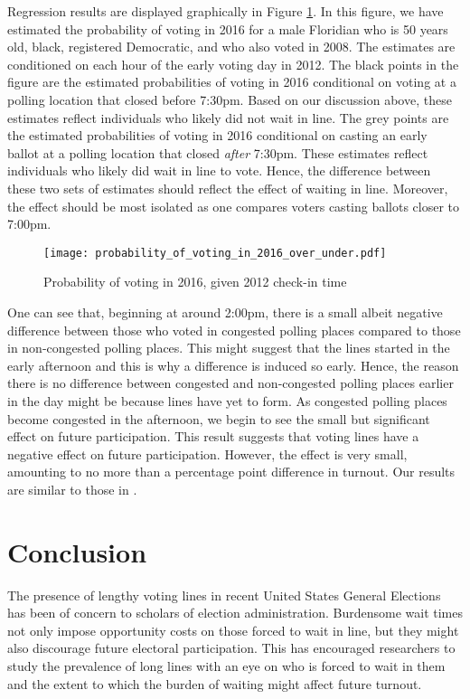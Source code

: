 \documentclass[12pt,titlepage]{article}
\begin{document}
Regression results are displayed graphically in Figure
\ref{fig:prvoting2016}. In this figure, we have estimated the
probability of voting in 2016 for a male Floridian who is 50 years
old, black, registered Democratic, and who also voted in 2008.  The
estimates are conditioned on each hour of the early voting day in
2012. The black points in the figure are the estimated probabilities
of voting in 2016 conditional on voting at a polling location that
closed before 7:30pm.  Based on our discussion above, these estimates
reflect individuals who likely did not wait in line.  The grey points
are the estimated probabilities of voting in 2016 conditional on
casting an early ballot at a polling location that closed \emph{after}
7:30pm.  These estimates reflect individuals who likely did wait in
line to vote.  Hence, the difference between these two sets of
estimates should reflect the effect of waiting in line.  Moreover, the
effect should be most isolated as one compares voters casting ballots
closer to 7:00pm.

\begin{figure}[!ht]
\caption{Probability of voting in 2016, given 2012 check-in time}
  \label{fig:prvoting2016}
  \centering
    \centering\texttt{[image: probability\_of\_voting\_in\_2016\_over\_under.pdf]}
\end{figure}

One can see that, beginning at around 2:00pm, there is a small albeit
negative difference between those who voted in congested polling
places compared to those in non-congested polling places.  This might
suggest that the lines started in the early afternoon and this is why
a difference is induced so early.  Hence, the reason there is no
difference between congested and non-congested polling places earlier
in the day might be because lines have yet to form. As congested
polling places become congested in the afternoon, we begin to see the
small but significant effect on future participation.  This result
suggests that voting lines have a negative effect on future
participation.  However, the effect is very small, amounting to no
more than a percentage point difference in turnout.  Our results are
similar to those in \citet{pettigrew:longlinesminorityprecincts}.

\section*{Conclusion}

The presence of lengthy voting lines in recent United States General
Elections has been of concern to scholars of election
administration. Burdensome wait times not only impose opportunity
costs on those forced to wait in line, but they might also discourage
future electoral participation.  This has encouraged researchers to
study the prevalence of long lines with an eye on who is forced to
wait in them and the extent to which the burden of waiting might
affect future turnout.
\end{document}
